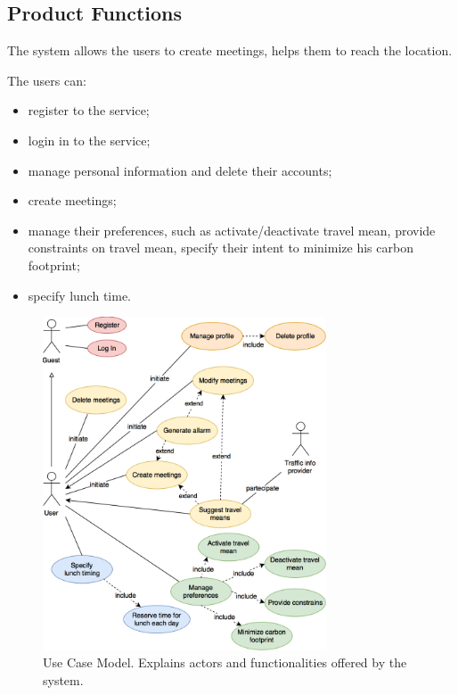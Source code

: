 \documentclass{article}
\begin{document}
	
	\subsection{Product Functions}
	The system allows the users to create meetings, helps them to reach the location.
	
	The users can:
	\begin{itemize}
		\item register to the service;
		\item login in to the service;
		\item manage personal information and delete their accounts;
		\item create meetings;
		\item manage their preferences, such as activate/deactivate travel mean, provide constraints on travel mean, specify their intent to minimize his carbon footprint;
		\item specify lunch time.
	\end{itemize}
	
	\bigskip
	\bigskip
	\begin{figure}[htbp]
		\begin{center}
		\includegraphics[width=0.75\textwidth]{img/UseCaseModel.png}
		\caption{Use Case Model. Explains actors and functionalities offered by the system.}
		\label{default}
		\end{center}
	\end{figure}
	
\end{document}
